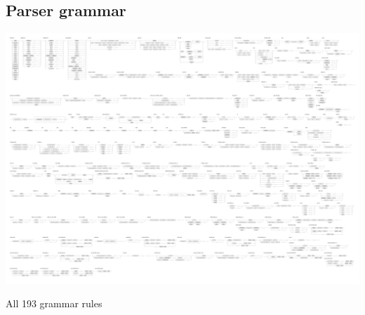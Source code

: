 \documentclass[10pt,a4paper]{report}
\begin{document}
\begin{appendices}
\begin{foldoutfloatlandscape}
	\chapter{Parser grammar}
	\label{parser_rules}
	\thispagestyle{empty}
	
	\includegraphics[width=45cm]{img/grammar}
	\caption{All 193 grammar rules}
\end{foldoutfloatlandscape}



\end{appendices}
\end{document}
